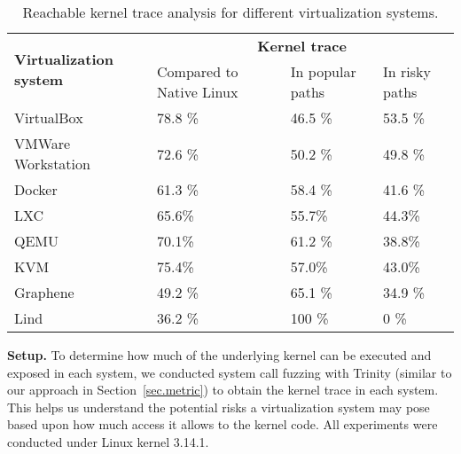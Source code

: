 {{\begin{table}
\centering
\scriptsize
\begin{tabular}{|l|l|l|l|}
  \hline
  \multirow{3}{1.5cm}{\bf Virtualization system} & \multicolumn{3}{c|}{\bf Kernel trace} \\ \cline{2-4}
  & \multirow{2}{1.5cm}{Compared to Native Linux} & \multirow{2}{1.5cm}{In popular paths} & \multirow{2}{1cm}{In risky paths} \\
  & & & \\  \hline
  VirtualBox & 78.8 \% & 46.5 \% & 53.5 \% \\
  \hline
  \multirow{2}{1.5cm}{VMWare Workstation} & \multirow{2}{*}{72.6 \%} &
  \multirow{2}{*}{50.2 \%} & \multirow{2}{*}{49.8 \%} \\
  & & & \\   \hline
  Docker & 61.3 \% & 58.4 \% & 41.6 \% \\
  \hline
  LXC &  65.6\% &  55.7\% &  44.3\% \\
  \hline
   QEMU &  70.1\% & 61.2 \% &  38.8\% \\
  \hline
   KVM &  75.4\% &  57.0\% &  43.0\% \\
  \hline
  Graphene & 49.2 \% & 65.1 \% & 34.9 \% \\
  \hline
  Lind & 36.2 \% & 100 \% & 0 \% \\
  \hline
\end{tabular}
\caption{\small Reachable kernel trace analysis for different virtualization
systems.}
\label{table:trace-systems}
\end{table}


\noindent
\textbf{Setup.}
To determine how much of the underlying kernel can be executed and exposed in
each system, 
we conducted system call fuzzing with Trinity (similar to our approach in Section~{\ref{sec.metric}}) to obtain
the kernel trace in each system. This helps us understand the potential risks a virtualization system
may pose based upon how much access it allows to the kernel code.
All experiments were conducted under Linux kernel 3.14.1.

}}
